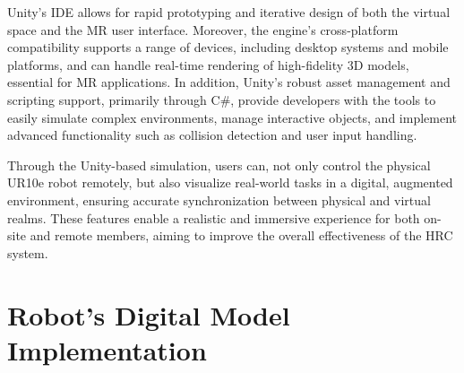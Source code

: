 Unity’s \ac{IDE} allows for rapid prototyping and iterative design of both the virtual space and the \ac{MR} user interface. Moreover, the engine's cross-platform compatibility supports a range of devices, including desktop systems and mobile platforms, and can handle real-time rendering of high-fidelity 3D models, essential for \ac{MR} applications. In addition, Unity’s robust asset management and scripting support, primarily through C\#, provide developers with the tools to easily simulate complex environments, manage interactive objects, and implement advanced functionality such as collision detection and user input handling.

Through the Unity-based simulation, users can, not only control the physical UR10e robot remotely, but also visualize real-world tasks in a digital, augmented environment, ensuring accurate synchronization between physical and virtual realms. These features enable a realistic and immersive experience for both on-site and remote members, aiming to improve the overall effectiveness of the \ac{HRC} system.







\section{Robot's Digital Model Implementation}
\label{section:digital-model}

